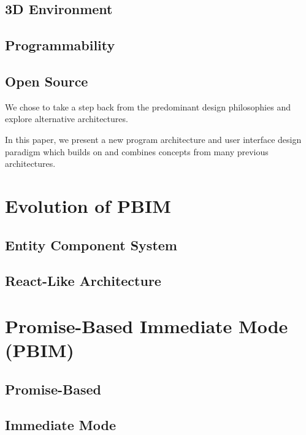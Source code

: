 \documentclass[conference,12pt]{IEEEtran}
\begin{document}
\subsection{3D Environment}

\subsection{Programmability}

\subsection{Open Source}

We chose to take a step back from the predominant design philosophies and
explore alternative architectures.

In this paper, we present a new program architecture and user interface design
paradigm which builds on and combines concepts from many previous architectures.

\section{Evolution of PBIM}

\subsection{Entity Component System}

\subsection{React-Like Architecture}

\section{Promise-Based Immediate Mode (PBIM)}

\subsection{Promise-Based}

\subsection{Immediate Mode}
\end{document}
